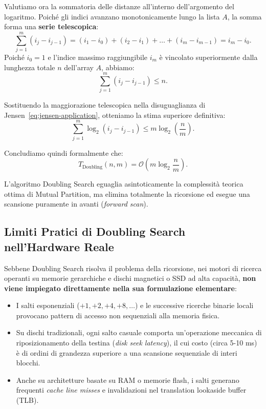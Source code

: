 Valutiamo ora la sommatoria delle distanze all'interno dell'argomento del logaritmo. Poiché gli indici avanzano monotonicamente lungo la lista $A$, la somma forma una \textbf{serie telescopica}:
\begin{equation}
  \sum_{j=1}^m (i_j - i_{j-1}) = (i_1 - i_0) + (i_2 - i_1) + \dots + (i_m - i_{m-1}) = i_m - i_0.
\end{equation}
Poiché $i_0 = 1$ e l'indice massimo raggiungibile $i_m$ è vincolato superiormente dalla lunghezza totale $n$ dell'array $A$, abbiamo:
\begin{equation}
  \sum_{j=1}^m (i_j - i_{j-1}) \le n.
\end{equation}

Sostituendo la maggiorazione telescopica nella disuguaglianza di Jensen~\eqref{eq:jensen-application}, otteniamo la stima superiore definitiva:
\begin{equation}
  \sum_{j=1}^m \log_2(i_j - i_{j-1}) \le m \log_2\left(\frac{n}{m}\right).
\end{equation}

Concludiamo quindi formalmente che:
\begin{equation}
  T_{\text{Doubling}}(n, m) = \mathcal{O}\left(m \log_2 \frac{n}{m}\right).
\end{equation}

L'algoritmo Doubling Search eguaglia asintoticamente la complessità teorica ottima di Mutual Partition, ma elimina totalmente la ricorsione ed esegue una scansione puramente in avanti (\textit{forward scan}).

\FloatBarrier
\subsection{Limiti Pratici di Doubling Search nell'Hardware Reale}
Sebbene Doubling Search risolva il problema della ricorsione, nei motori di ricerca operanti su memorie gerarchiche e dischi magnetici o SSD ad alta capacità, \textbf{non viene impiegato direttamente nella sua formulazione elementare}:
\begin{itemize}
  \item I salti esponenziali ($+1, +2, +4, +8, \dots$) e le successive ricerche binarie locali provocano pattern di accesso non sequenziali alla memoria fisica.
  \item Su dischi tradizionali, ogni salto casuale comporta un'operazione meccanica di riposizionamento della testina (\textit{disk seek latency}), il cui costo (circa 5-10 ms) è di ordini di grandezza superiore a una scansione sequenziale di interi blocchi.
  \item Anche su architetture basate su RAM o memorie flash, i salti generano frequenti \textit{cache line misses} e invalidazioni nel translation lookaside buffer (TLB).
\end{itemize}

